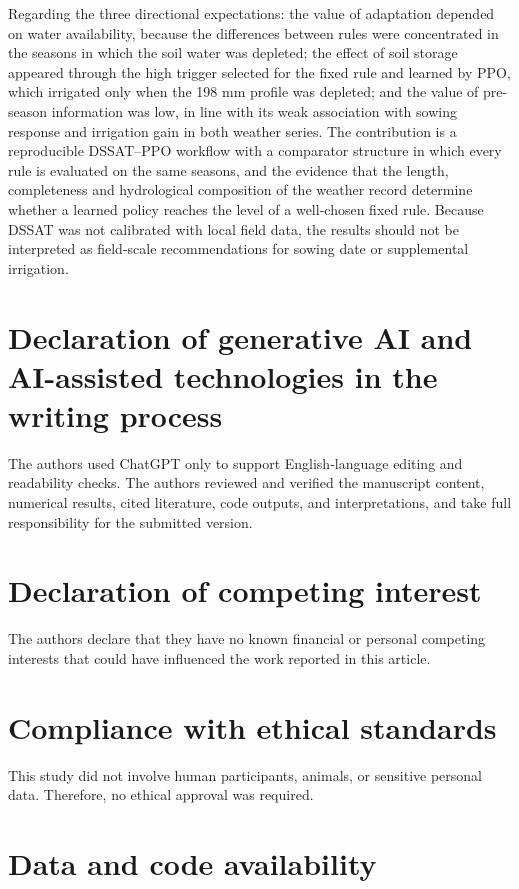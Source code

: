 \documentclass[times,final,authoryear]{elsarticle}
\begin{document}
Regarding the three directional expectations: the value of adaptation depended on water availability, because the differences between rules were concentrated in the seasons in which the soil water was depleted; the effect of soil storage appeared through the high trigger selected for the fixed rule and learned by PPO, which irrigated only when the 198 mm profile was depleted; and the value of pre-season information was low, in line with its weak association with sowing response and irrigation gain in both weather series. The contribution is a reproducible DSSAT--PPO workflow with a comparator structure in which every rule is evaluated on the same seasons, and the evidence that the length, completeness and hydrological composition of the weather record determine whether a learned policy reaches the level of a well-chosen fixed rule. Because DSSAT was not calibrated with local field data, the results should not be interpreted as field-scale recommendations for sowing date or supplemental irrigation.
\section*{Declaration of generative AI and AI-assisted technologies in the writing process}

The authors used ChatGPT only to support English-language editing and readability checks. The authors reviewed and verified the manuscript content, numerical results, cited literature, code outputs, and interpretations, and take full responsibility for the submitted version.

\section*{Declaration of competing interest}
The authors declare that they have no known financial or personal competing interests that could have influenced the work reported in this article.

\section*{Compliance with ethical standards}
This study did not involve human participants, animals, or sensitive personal data. Therefore, no ethical approval was required.

\section*{Data and code availability}
\end{document}
